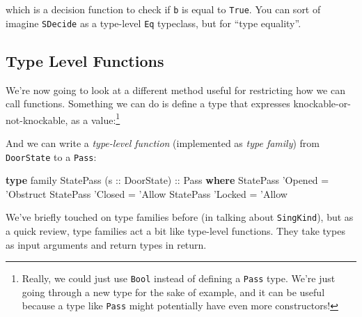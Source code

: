 \documentclass[]{article}
\newenvironment{Shaded}{}{}
\newcommand{\DataTypeTok}[1]{\textcolor[rgb]{0.56,0.13,0.00}{#1}}
\newcommand{\FunctionTok}[1]{\textcolor[rgb]{0.02,0.16,0.49}{#1}}
\newcommand{\KeywordTok}[1]{\textcolor[rgb]{0.00,0.44,0.13}{\textbf{#1}}}
\newcommand{\NormalTok}[1]{#1}
\newcommand{\OtherTok}[1]{\textcolor[rgb]{0.00,0.44,0.13}{#1}}
\begin{document}
which is a decision function to check if \texttt{b} is equal to
\texttt{\textquotesingle{}True}. You can sort of imagine \texttt{SDecide} as a
type-level \texttt{Eq} typeclass, but for ``type equality''.

\hypertarget{type-level-functions}{%
\subsection{Type Level Functions}\label{type-level-functions}}

We're now going to look at a different method useful for restricting how we can
call functions. Something we can do is define a type that expresses
knockable-or-not-knockable, as a value:\footnote{Really, we could just use
  \texttt{Bool} instead of defining a \texttt{Pass} type. We're just going
  through a new type for the sake of example, and it can be useful because a
  type like \texttt{Pass} might potentially have even more constructors!}

\begin{Shaded}
\end{Shaded}

And we can write a \emph{type-level function} (implemented as \emph{type
family}) from \texttt{DoorState} to a \texttt{Pass}:

\begin{Shaded}
\begin{Highlighting}[]
\KeywordTok{type}\NormalTok{ family }\DataTypeTok{StatePass}\NormalTok{ (}\OtherTok{s ::} \DataTypeTok{DoorState}\NormalTok{)}\OtherTok{ ::} \DataTypeTok{Pass} \KeywordTok{where}
    \DataTypeTok{StatePass}\NormalTok{ '}\DataTypeTok{Opened} \FunctionTok{=}\NormalTok{ '}\DataTypeTok{Obstruct}
    \DataTypeTok{StatePass}\NormalTok{ '}\DataTypeTok{Closed} \FunctionTok{=}\NormalTok{ '}\DataTypeTok{Allow}
    \DataTypeTok{StatePass}\NormalTok{ '}\DataTypeTok{Locked} \FunctionTok{=}\NormalTok{ '}\DataTypeTok{Allow}
\end{Highlighting}
\end{Shaded}

We've briefly touched on type families before (in talking about
\texttt{SingKind}), but as a quick review, type families act a bit like
type-level functions. They take types as input arguments and return types in
return.
\end{document}
